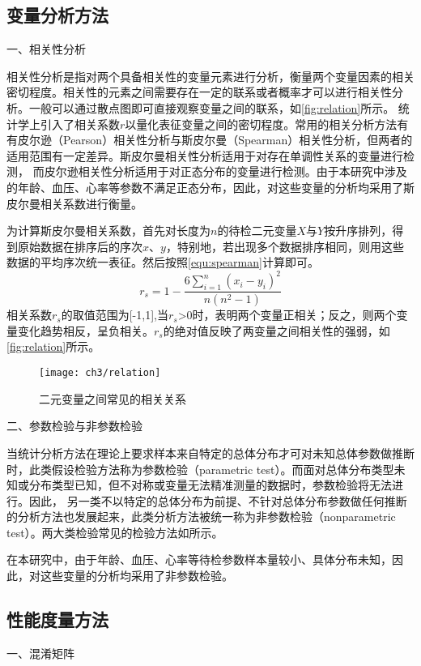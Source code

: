 \subsection{变量分析方法}
一、相关性分析

相关性分析是指对两个具备相关性的变量元素进行分析，衡量两个变量因素的相关密切程度\cite{Zhang2019}。相关性的元素之间需要存在一定的联系或者概率才可以进行相关性分析。一般可以通过散点图即可直接观察变量之间的联系，如\autoref{fig:relation}所示。
统计学上引入了相关系数$r$以量化表征变量之间的密切程度。常用的相关分析方法有有皮尔逊（Pearson）相关性分析与斯皮尔曼（Spearman）相关性分析，但两者的适用范围有一定差异。斯皮尔曼相关性分析适用于对存在单调性关系的变量进行检测，
而皮尔逊相关性分析适用于对正态分布的变量进行检测。由于本研究中涉及的年龄、血压、心率等参数不满足正态分布，因此，对这些变量的分析均采用了斯皮尔曼相关系数进行衡量。

为计算斯皮尔曼相关系数，首先对长度为$n$的待检二元变量$X$与$Y$按升序排列，得到原始数据在排序后的序次$x$、$y$，特别地，若出现多个数据排序相同，则用这些数据的平均序次统一表征。然后按照\autoref{equ:spearman}计算即可。
\begin{equation}
      \label{equ:spearman}
      r_{s}=1-\frac{6\sum_{i=1}^{n}(x_{i}-y_{i})^2}{n(n^2-1)}
\end{equation}
相关系数$r_{s}$的取值范围为[-1,1],当$r_{s}$>0时，表明两个变量正相关；反之，则两个变量变化趋势相反，呈负相关。$r_{s}$的绝对值反映了两变量之间相关性的强弱，如\autoref{fig:relation}所示。
\begin{figure}[htbp]
      \centering
      \texttt{[image: ch3/relation]}
      \caption{\label{fig:relation}二元变量之间常见的相关关系}
\end{figure}

二、参数检验与非参数检验

当统计分析方法在理论上要求样本来自特定的总体分布才可对未知总体参数做推断时，此类假设检验方法称为参数检验（parametric test）。而面对总体分布类型未知或分布类型已知，但不对称或变量无法精准测量的数据时，参数检验将无法进行。因此，
另一类不以特定的总体分布为前提、不针对总体分布参数做任何推断的分析方法也发展起来，此类分析方法被统一称为非参数检验（nonparametric test）\cite{Guo2017,Hu2021,Zhang2019}。两大类检验常见的检验方法如所示。

在本研究中，由于年龄、血压、心率等待检参数样本量较小、具体分布未知，因此，对这些变量的分析均采用了非参数检验。

\subsection{性能度量方法}
一、混淆矩阵

